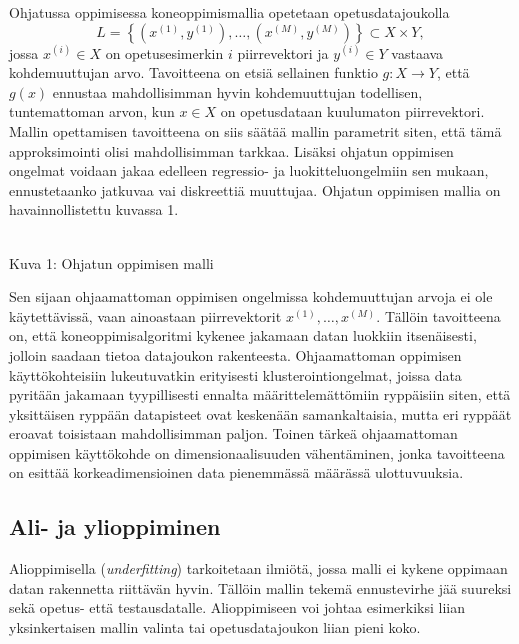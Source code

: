\documentclass[12pt,a4paper,finnish,oneside,titlepage]{article}
\theoremstyle{plain}
\theoremstyle{definition}
\theoremstyle{remark}
\begin{document}
Ohjatussa oppimisessa koneoppimismallia opetetaan opetusdatajoukolla \[L=\left\{(x^{(1)}, y^{(1)}), \ldots, (x^{(M)}, y^{(M)})\right\}\subset X\times Y,\] jossa \(x^{(i)}\in X\) on opetusesimerkin \(i\) piirrevektori ja \(y^{(i)}\in Y\) vastaava kohdemuuttujan arvo. Tavoitteena on etsiä sellainen funktio \(g : X\to Y\), että \(g(x)\) ennustaa mahdollisimman hyvin kohdemuuttujan todellisen, tuntemattoman arvon, kun \(x\in X\) on opetusdataan kuulumaton piirrevektori. Mallin opettamisen tavoitteena on siis säätää mallin parametrit siten, että tämä approksimointi olisi mahdollisimman tarkkaa.  Lisäksi ohjatun oppimisen ongelmat voidaan jakaa edelleen regressio- ja luokitteluongelmiin sen mukaan, ennustetaanko jatkuvaa vai diskreettiä muuttujaa. Ohjatun oppimisen mallia on havainnollistettu kuvassa 1.
\begin{center}
\vspace{0.1in}
\\Kuva 1: Ohjatun oppimisen malli
\end{center}

Sen sijaan ohjaamattoman oppimisen ongelmissa kohdemuuttujan arvoja ei ole käytettävissä, vaan ainoastaan piirrevektorit \(x^{(1)}, \ldots, x^{(M)}\). Tällöin tavoitteena on, että koneoppimisalgoritmi kykenee jakamaan datan luokkiin itsenäisesti, jolloin saadaan tietoa datajoukon rakenteesta. Ohjaamattoman oppimisen käyttökohteisiin lukeutuvatkin erityisesti klusterointiongelmat, joissa data pyritään jakamaan tyypillisesti ennalta määrittelemättömiin ryppäisiin siten, että yksittäisen ryppään datapisteet ovat keskenään samankaltaisia, mutta eri ryppäät eroavat toisistaan mahdollisimman paljon. Toinen tärkeä ohjaamattoman oppimisen käyttökohde on dimensionaalisuuden vähentäminen, jonka tavoitteena on esittää korkeadimensioinen data pienemmässä määrässä ulottuvuuksia.

\subsection{Ali- ja ylioppiminen}
Alioppimisella (\emph{underfitting}) tarkoitetaan ilmiötä, jossa malli ei kykene oppimaan datan rakennetta riittävän hyvin. Tällöin mallin tekemä ennustevirhe jää suureksi sekä opetus- että testausdatalle. Alioppimiseen voi johtaa esimerkiksi liian yksinkertaisen mallin valinta tai opetusdatajoukon liian pieni koko.
\end{document}
